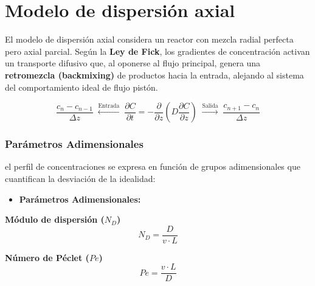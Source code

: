 \section{Modelo de dispersión axial}
\begin{flushleft}
    El modelo de dispersión axial considera un reactor con mezcla radial perfecta pero axial parcial. Según la \textbf{Ley de Fick}, los gradientes de concentración activan un transporte difusivo que, al oponerse al flujo principal, genera una \textbf{retromezcla (backmixing)} de productos hacia la entrada, alejando al sistema del comportamiento ideal de flujo pistón.
\end{flushleft}
\begin{equation}
    \frac{c_n - c_{n-1}}{\Delta z}
    \;\xleftarrow{\text{Entrada}}\;
    \boxed{
        \frac{\partial C}{\partial t}
        =
        -\frac{\partial}{\partial z}
        \left( D \frac{\partial C}{\partial z} \right)
    }
    \;\xrightarrow{\text{Salida}}\;
    \frac{c_{n+1} - c_n}{\Delta z}
\end{equation}


\subsubsection*{Parámetros Adimensionales}

\noindent el perfil de concentraciones se expresa en función de grupos adimensionales que cuantifican la desviación de la idealidad:

\begin{itemize}
    \item \textbf{Parámetros Adimensionales:}
\end{itemize}

\noindent
\begin{minipage}{0.5\textwidth}
    \centering
    \textbf{Módulo de dispersión ($N_D$)}
    \[ N_D = \frac{D}{v \cdot L} \]
\end{minipage}%
\begin{minipage}{0.5\textwidth}
    \centering
    \textbf{Número de Péclet ($Pe$)}
    \[ Pe = \frac{v \cdot L}{D} \]
\end{minipage}
\vspace{0.5cm}
